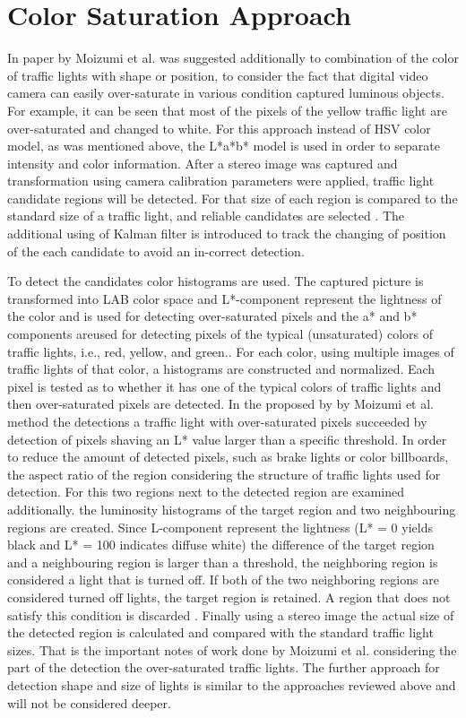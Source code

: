 \documentclass[letterpaper, 10 pt, conference]{ieeeconf} %
\begin{document}

\section{Color Saturation Approach}
In paper by Moizumi et al. \cite{c3} was suggested additionally to combination of the color of traffic lights with shape or position, to consider the fact that digital video camera can easily over-saturate in various condition captured luminous objects. For example, it can be seen that most of the pixels of the yellow traffic light are over-saturated and changed to white. For this approach instead of HSV color model, as was mentioned above, the L*a*b* model is used in order to separate intensity and color information. After a stereo image was captured and transformation using camera calibration parameters were applied, traffic light candidate regions will be detected. For that size of each region is compared to the standard size of a traffic light, and reliable candidates are selected \cite{c3}. The additional using of Kalman filter is introduced to track the changing of position of the each candidate to avoid an in-correct detection. 

To detect the candidates color histograms are used. The captured picture is transformed into LAB color space and L*-component represent the lightness of the color  and is used for detecting over-saturated pixels and the a* and b* components areused for detecting pixels of the typical (unsaturated) colors of traffic lights, i.e., red, yellow, and green.\cite{c3}. For each color, using multiple images of traffic lights of that color, a histograms are constructed and normalized. Each pixel is tested as to whether it has one of the typical colors of traffic lights and then over-saturated pixels are detected. In the proposed by by Moizumi et al. method the detections a traffic light with over-saturated pixels succeeded by detection of pixels shaving an L* value larger than a specific threshold. In order to reduce the amount of detected pixels, such as brake lights or color billboards, the aspect ratio of the region considering the structure of traffic lights used for detection. For this two regions next to the detected region are examined additionally. the luminosity histograms of the target region and two neighbouring regions are created. Since L-component represent the lightness (L* = 0 yields black and L* = 100 indicates diffuse white) the difference of the target region and a neighbouring region is larger than a threshold, the neighboring region is considered a light that is turned off. If both of the two neighboring regions are considered turned off lights, the target region is retained. A region that does not satisfy this condition is discarded \cite{c3}. Finally using a stereo image the actual size of the detected region is calculated and compared with the standard traffic light sizes. That is the important notes of work done by Moizumi et al. considering the part of the detection the over-saturated traffic lights. The further approach for detection shape and size of lights is similar to the approaches reviewed above and will not be considered deeper. 
\end{document}
